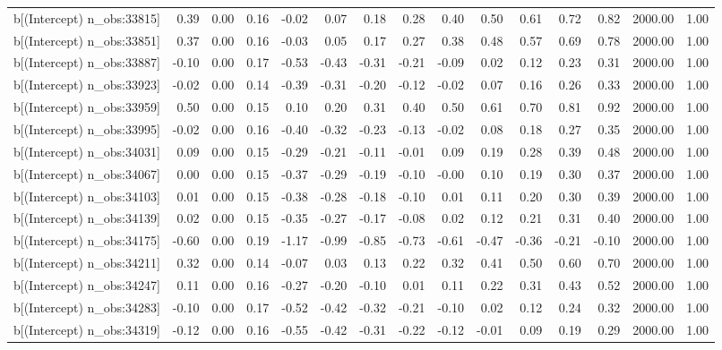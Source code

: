 \begin{table}[ht]
\begin{tabular}{rrrrrrrrrrrrrrr}
  b[(Intercept) n\_obs:33815] & 0.39 & 0.00 & 0.16 & -0.02 & 0.07 & 0.18 & 0.28 & 0.40 & 0.50 & 0.61 & 0.72 & 0.82 & 2000.00 & 1.00 \\ 
  b[(Intercept) n\_obs:33851] & 0.37 & 0.00 & 0.16 & -0.03 & 0.05 & 0.17 & 0.27 & 0.38 & 0.48 & 0.57 & 0.69 & 0.78 & 2000.00 & 1.00 \\ 
  b[(Intercept) n\_obs:33887] & -0.10 & 0.00 & 0.17 & -0.53 & -0.43 & -0.31 & -0.21 & -0.09 & 0.02 & 0.12 & 0.23 & 0.31 & 2000.00 & 1.00 \\ 
  b[(Intercept) n\_obs:33923] & -0.02 & 0.00 & 0.14 & -0.39 & -0.31 & -0.20 & -0.12 & -0.02 & 0.07 & 0.16 & 0.26 & 0.33 & 2000.00 & 1.00 \\ 
  b[(Intercept) n\_obs:33959] & 0.50 & 0.00 & 0.15 & 0.10 & 0.20 & 0.31 & 0.40 & 0.50 & 0.61 & 0.70 & 0.81 & 0.92 & 2000.00 & 1.00 \\ 
  b[(Intercept) n\_obs:33995] & -0.02 & 0.00 & 0.16 & -0.40 & -0.32 & -0.23 & -0.13 & -0.02 & 0.08 & 0.18 & 0.27 & 0.35 & 2000.00 & 1.00 \\ 
  b[(Intercept) n\_obs:34031] & 0.09 & 0.00 & 0.15 & -0.29 & -0.21 & -0.11 & -0.01 & 0.09 & 0.19 & 0.28 & 0.39 & 0.48 & 2000.00 & 1.00 \\ 
  b[(Intercept) n\_obs:34067] & 0.00 & 0.00 & 0.15 & -0.37 & -0.29 & -0.19 & -0.10 & -0.00 & 0.10 & 0.19 & 0.30 & 0.37 & 2000.00 & 1.00 \\ 
  b[(Intercept) n\_obs:34103] & 0.01 & 0.00 & 0.15 & -0.38 & -0.28 & -0.18 & -0.10 & 0.01 & 0.11 & 0.20 & 0.30 & 0.39 & 2000.00 & 1.00 \\ 
  b[(Intercept) n\_obs:34139] & 0.02 & 0.00 & 0.15 & -0.35 & -0.27 & -0.17 & -0.08 & 0.02 & 0.12 & 0.21 & 0.31 & 0.40 & 2000.00 & 1.00 \\ 
  b[(Intercept) n\_obs:34175] & -0.60 & 0.00 & 0.19 & -1.17 & -0.99 & -0.85 & -0.73 & -0.61 & -0.47 & -0.36 & -0.21 & -0.10 & 2000.00 & 1.00 \\ 
  b[(Intercept) n\_obs:34211] & 0.32 & 0.00 & 0.14 & -0.07 & 0.03 & 0.13 & 0.22 & 0.32 & 0.41 & 0.50 & 0.60 & 0.70 & 2000.00 & 1.00 \\ 
  b[(Intercept) n\_obs:34247] & 0.11 & 0.00 & 0.16 & -0.27 & -0.20 & -0.10 & 0.01 & 0.11 & 0.22 & 0.31 & 0.43 & 0.52 & 2000.00 & 1.00 \\ 
  b[(Intercept) n\_obs:34283] & -0.10 & 0.00 & 0.17 & -0.52 & -0.42 & -0.32 & -0.21 & -0.10 & 0.02 & 0.12 & 0.24 & 0.32 & 2000.00 & 1.00 \\ 
  b[(Intercept) n\_obs:34319] & -0.12 & 0.00 & 0.16 & -0.55 & -0.42 & -0.31 & -0.22 & -0.12 & -0.01 & 0.09 & 0.19 & 0.29 & 2000.00 & 1.00 \\ 

\end{tabular}
\end{table}
